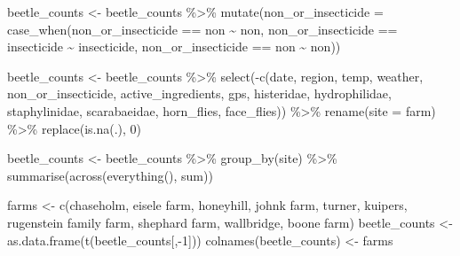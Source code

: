 \documentclass[
]{article}
\newenvironment{Shaded}{\begin{snugshade}}{\end{snugshade}}
\newcommand{\AttributeTok}[1]{\textcolor[rgb]{0.77,0.63,0.00}{#1}}
\newcommand{\DecValTok}[1]{\textcolor[rgb]{0.00,0.00,0.81}{#1}}
\newcommand{\FunctionTok}[1]{\textcolor[rgb]{0.00,0.00,0.00}{#1}}
\newcommand{\NormalTok}[1]{#1}
\newcommand{\OtherTok}[1]{\textcolor[rgb]{0.56,0.35,0.01}{#1}}
\newcommand{\SpecialCharTok}[1]{\textcolor[rgb]{0.00,0.00,0.00}{#1}}
\newcommand{\StringTok}[1]{\textcolor[rgb]{0.31,0.60,0.02}{#1}}
\begin{document}
\begin{Shaded}
\begin{Highlighting}[]
\NormalTok{beetle\_counts }\OtherTok{\textless{}{-}}\NormalTok{ beetle\_counts }\SpecialCharTok{\%\textgreater{}\%}
  \FunctionTok{mutate}\NormalTok{(}\AttributeTok{non\_or\_insecticide =} \FunctionTok{case\_when}\NormalTok{(non\_or\_insecticide }\SpecialCharTok{==} \StringTok{\textquotesingle{}non   \textquotesingle{}} \SpecialCharTok{\textasciitilde{}} \StringTok{\textquotesingle{}non\textquotesingle{}}\NormalTok{,}
\NormalTok{                                        non\_or\_insecticide }\SpecialCharTok{==} \StringTok{\textquotesingle{}insecticide\textquotesingle{}} \SpecialCharTok{\textasciitilde{}} \StringTok{\textquotesingle{}insecticide\textquotesingle{}}\NormalTok{,}
\NormalTok{                                        non\_or\_insecticide }\SpecialCharTok{==} \StringTok{\textquotesingle{}non\textquotesingle{}} \SpecialCharTok{\textasciitilde{}} \StringTok{\textquotesingle{}non\textquotesingle{}}\NormalTok{))}

\NormalTok{beetle\_counts }\OtherTok{\textless{}{-}}\NormalTok{ beetle\_counts }\SpecialCharTok{\%\textgreater{}\%}
  \FunctionTok{select}\NormalTok{(}\SpecialCharTok{{-}}\FunctionTok{c}\NormalTok{(date, region, temp, weather, non\_or\_insecticide, active\_ingredients, gps, histeridae, hydrophilidae, staphylinidae, scarabaeidae, horn\_flies, face\_flies)) }\SpecialCharTok{\%\textgreater{}\%}
  \FunctionTok{rename}\NormalTok{(}\AttributeTok{site =}\NormalTok{ farm) }\SpecialCharTok{\%\textgreater{}\%}
  \FunctionTok{replace}\NormalTok{(}\FunctionTok{is.na}\NormalTok{(.), }\DecValTok{0}\NormalTok{)}

\NormalTok{beetle\_counts }\OtherTok{\textless{}{-}}\NormalTok{ beetle\_counts }\SpecialCharTok{\%\textgreater{}\%} 
  \FunctionTok{group\_by}\NormalTok{(site) }\SpecialCharTok{\%\textgreater{}\%} 
  \FunctionTok{summarise}\NormalTok{(}\FunctionTok{across}\NormalTok{(}\FunctionTok{everything}\NormalTok{(), sum))}

\NormalTok{farms }\OtherTok{\textless{}{-}} \FunctionTok{c}\NormalTok{(}\StringTok{\textquotesingle{}chaseholm\textquotesingle{}}\NormalTok{, }\StringTok{\textquotesingle{}eisele farm\textquotesingle{}}\NormalTok{, }\StringTok{\textquotesingle{}honeyhill\textquotesingle{}}\NormalTok{, }\StringTok{\textquotesingle{}johnk farm\textquotesingle{}}\NormalTok{, }\StringTok{\textquotesingle{}turner\textquotesingle{}}\NormalTok{, }\StringTok{\textquotesingle{}kuipers\textquotesingle{}}\NormalTok{, }\StringTok{\textquotesingle{}rugenstein family farm\textquotesingle{}}\NormalTok{, }\StringTok{\textquotesingle{}shephard farm\textquotesingle{}}\NormalTok{, }\StringTok{\textquotesingle{}wallbridge\textquotesingle{}}\NormalTok{, }\StringTok{\textquotesingle{}boone farm\textquotesingle{}}\NormalTok{)}
\NormalTok{beetle\_counts }\OtherTok{\textless{}{-}} \FunctionTok{as.data.frame}\NormalTok{(}\FunctionTok{t}\NormalTok{(beetle\_counts[,}\SpecialCharTok{{-}}\DecValTok{1}\NormalTok{]))}
\FunctionTok{colnames}\NormalTok{(beetle\_counts) }\OtherTok{\textless{}{-}}\NormalTok{ farms}


\end{Highlighting}
\end{Shaded}
\end{document}
